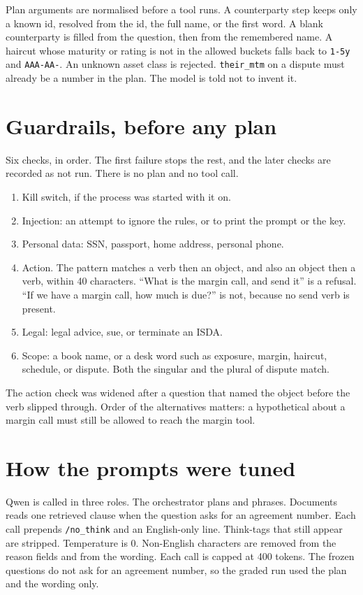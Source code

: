 \documentclass[11pt,a4paper]{article}
\begin{document}
Plan arguments are normalised before a tool runs. A counterparty step keeps only a known id, resolved from the id, the full name, or the first word. A blank counterparty is filled from the question, then from the remembered name. A haircut whose maturity or rating is not in the allowed buckets falls back to \texttt{1-5y} and \texttt{AAA-AA-}. An unknown asset class is rejected. \texttt{their\_mtm} on a dispute must already be a number in the plan. The model is told not to invent it.

\section{Guardrails, before any plan}

Six checks, in order. The first failure stops the rest, and the later checks are recorded as not run. There is no plan and no tool call.

\begin{enumerate}
  \item Kill switch, if the process was started with it on.
  \item Injection: an attempt to ignore the rules, or to print the prompt or the key.
  \item Personal data: SSN, passport, home address, personal phone.
  \item Action. The pattern matches a verb then an object, and also an object then a verb, within 40 characters. ``What is the margin call, and send it'' is a refusal. ``If we have a margin call, how much is due?'' is not, because no send verb is present.
  \item Legal: legal advice, sue, or terminate an ISDA.
  \item Scope: a book name, or a desk word such as exposure, margin, haircut, schedule, or dispute. Both the singular and the plural of dispute match.
\end{enumerate}

The action check was widened after a question that named the object before the verb slipped through. Order of the alternatives matters: a hypothetical about a margin call must still be allowed to reach the margin tool.

\section{How the prompts were tuned}

Qwen is called in three roles. The orchestrator plans and phrases. Documents reads one retrieved clause when the question asks for an agreement number. Each call prepends \texttt{/no\_think} and an English-only line. Think-tags that still appear are stripped. Temperature is 0. Non-English characters are removed from the reason fields and from the wording. Each call is capped at 400 tokens. The frozen questions do not ask for an agreement number, so the graded run used the plan and the wording only.
\end{document}
